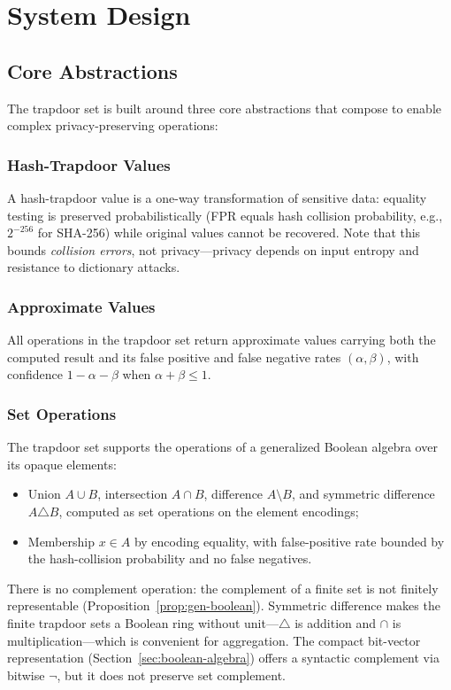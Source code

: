 \documentclass[10pt,conference]{IEEEtran}
\begin{document}
\section{System Design}
\label{sec:design}

\subsection{Core Abstractions}

The trapdoor set is built around three core abstractions that compose to enable complex privacy-preserving operations:

\subsubsection{Hash-Trapdoor Values}

A hash-trapdoor value is a one-way transformation of sensitive data: equality testing is preserved probabilistically (FPR equals hash collision probability, e.g., $2^{-256}$ for SHA-256) while original values cannot be recovered. Note that this bounds \emph{collision errors}, not privacy---privacy depends on input entropy and resistance to dictionary attacks.

\subsubsection{Approximate Values}

All operations in the trapdoor set return approximate values carrying both the computed result and its false positive and false negative rates $(\alpha, \beta)$, with confidence $1 - \alpha - \beta$ when $\alpha + \beta \leq 1$.

\subsubsection{Set Operations}

The trapdoor set supports the operations of a generalized Boolean algebra over its opaque elements:
\begin{itemize}
\item Union $A \cup B$, intersection $A \cap B$, difference $A \setminus B$, and symmetric difference $A \triangle B$, computed as set operations on the element encodings;
\item Membership $x \in A$ by encoding equality, with false-positive rate bounded by the hash-collision probability and no false negatives.
\end{itemize}
There is no complement operation: the complement of a finite set is not finitely representable (Proposition~\ref{prop:gen-boolean}). Symmetric difference makes the finite trapdoor sets a Boolean ring without unit---$\triangle$ is addition and $\cap$ is multiplication---which is convenient for aggregation. The compact bit-vector representation (Section~\ref{sec:boolean-algebra}) offers a syntactic complement via bitwise $\neg$, but it does not preserve set complement.
\end{document}
